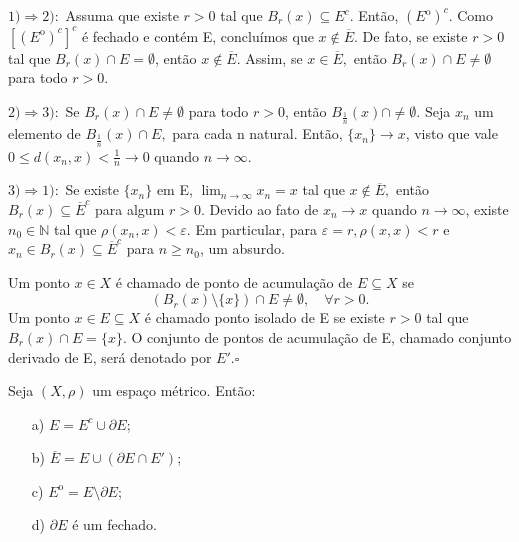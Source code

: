 \documentclass[MetricSpaces/metric_notes.tex]{subfiles}
\begin{document}
\begin{proof*}
	\(1) \Rightarrow 2):\) Assuma que existe \(r > 0\) tal que \(B_{r}(x)\subseteq{E^{c}}\). Então,
	\(({E}^{\mathrm{o}})^{c}.\) Como \([({E}^{\mathrm{o}})^{c}]^{c}\) é fechado e contém E, concluímos que
	\(x\not\in \overline{E}.\) De fato, se existe \(r > 0\) tal que \(B_{r}(x)\cap E = \emptyset\), então \(x\not\in \overline{E}\).
	Assim, se \(x\in \overline{E},\) então \(B_{r}(x)\cap E \neq\emptyset\) para todo \(r > 0\).

	\(2)\Rightarrow 3):\) Se \(B_{r}(x)\cap E \neq\emptyset\) para todo \(r > 0\), então \(B_{\frac{1}{n}}(x)\cap \neq\emptyset.\) Seja
	\(x_{n}\) um elemento de \(B_{\frac{1}{n}}(x)\cap E,\) para cada n natural. Então, \(\{x_{n}\}\rightarrow x\), visto que vale \(0\leq d(x_{n}, x) < \frac{1}{n}\rightarrow 0\)
	quando \(n\rightarrow\infty.\)


	\(3) \Rightarrow 1):\) Se existe \(\{x_{n}\}\) em E, \(\lim_{n\to \infty}x_{n} = x\) tal que \(x\not\in \overline{E},\) então \(B_{r}(x)\subseteq{\overline{E}^{c}}\)
	para algum \(r>0.\) Devido ao fato de \(x_{n}\rightarrow x\) quando \(n\rightarrow \infty\), existe \(n_{0}\in \mathbb{N}\) tal que \(\rho(x_{n}, x) < \varepsilon \).
	Em particular, para \(\varepsilon = r, \rho(x, x) < r\)  e \(x_{n}\in B_{r}(x)\subseteq{\overline{E}^{c}}\) para \(n\geq n_{0}\), um absurdo. \qedsymbol
\end{proof*}
\begin{def*}
	Um ponto \(x\in X\) é chamado de ponto de acumulação de \(E\subseteq{X}\) se
	\[
		(B_{r}(x)\setminus\{x\})\cap E \neq\emptyset,\quad \forall r>0.
	\]
	Um ponto \(x\in E\subseteq{X}\) é chamado ponto isolado de E se existe \(r > 0\) tal que
	\(B_{r}(x)\cap{E} = \{x\}\). O conjunto de pontos de acumulação de E, chamado conjunto derivado
	de E, será denotado por \(E'. \square\)
\end{def*}
\begin{prop*}
	Seja \((X, \rho )\) um espaço métrico. Então:
	\begin{itemize}
		\item[a)] \(E = E^{c}\cup \partial E\);
		\item[b)] \(\overline{E} = E\cup (\partial E\cap E')\);
		\item[c)] \({E}^{\mathrm{o}} = E\setminus{\partial E}\);
		\item[d)] \(\partial E\) é um fechado.
	\end{itemize}
\end{prop*}
\end{document}
